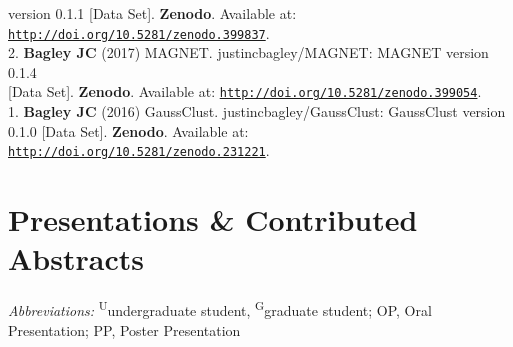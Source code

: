 \documentclass[margin,line]{res}
\begin{document}
\begin{resume}
\hspace*{8mm} version 0.1.1 [Data Set]. \textbf{Zenodo}. Available at:\\  \vspace{2mm}
\hspace*{8mm}\href{http://doi.org/10.5281/zenodo.399837}{\tt http://doi.org/10.5281/zenodo.399837}. \\
2. \textbf{Bagley JC} (2017) MAGNET. justincbagley/MAGNET: MAGNET version 0.1.4\\ \vspace{2mm}
\hspace*{8mm}[Data Set]. \textbf{Zenodo}. Available at: \href{http://doi.org/10.5281/zenodo.399054}{\tt http://doi.org/10.5281/zenodo.399054}. \\
1. \textbf{Bagley JC} (2016) GaussClust. justincbagley/GaussClust: GaussClust version\\
\hspace*{8mm} 0.1.0 [Data Set]. \textbf{Zenodo}. Available at: \href{http://doi.org/10.5281/zenodo.231221}{\tt http://doi.org/10.5281/zenodo.231221}.



\section{\sc Presentations \& Contributed Abstracts}

\emph{Abbreviations:} \textsuperscript{U}undergraduate student, \textsuperscript{G}graduate student; OP, Oral Presentation; PP, Poster Presentation


\end{resume}
\end{document}
